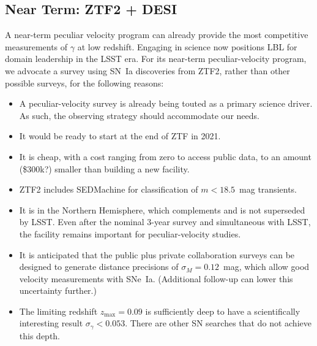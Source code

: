 \documentclass[11pt, oneside]{article}   	%
\begin{document}
\subsection{Near Term: ZTF2 + DESI}
A near-term peculiar velocity program can already provide the most competitive measurements of $\gamma$ at low redshift.  Engaging in science
now positions LBL for domain leadership in the LSST era.  For its near-term peculiar-velocity program, we advocate a survey using SN~Ia discoveries from ZTF2,
rather than other possible surveys, for the following reasons:
\begin{itemize}
\item A peculiar-velocity survey is already being touted as a primary science driver. As such,
the observing strategy should accommodate our needs.
\item It would be ready to start at the end of ZTF in 2021.
\item It is cheap, with a cost ranging from zero to access public data, to an amount (\$300k?) smaller
than building a new facility.
\item ZTF2 includes SEDMachine for classification of $m<18.5$~mag  transients.
\item It is in the Northern Hemisphere, which complements and is not superseded by LSST. 
Even after the nominal 3-year survey and simultaneous with LSST, the facility remains important for peculiar-velocity studies.
\item It is anticipated that the public plus private collaboration surveys can be designed to generate distance
precisions of $\sigma_M =0.12$~mag, which allow good velocity measurements with SNe~Ia.  (Additional follow-up can lower this uncertainty further.)
\item The limiting redshift $z_{\text{max}} =0.09$ is sufficiently deep  to have a scientifically interesting result $\sigma_\gamma < 0.053$.
There are other SN searches that do not achieve this depth.
\end{itemize}
\end{document}
